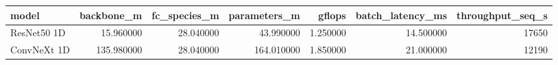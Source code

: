 \begin{tabular}{lrrrrrr}
\toprule
model & backbone_m & fc_species_m & parameters_m & gflops & batch_latency_ms & throughput_seq_s \\
\midrule
ResNet50 1D & 15.960000 & 28.040000 & 43.990000 & 1.250000 & 14.500000 & 17650 \\
ConvNeXt 1D & 135.980000 & 28.040000 & 164.010000 & 1.850000 & 21.000000 & 12190 \\
\bottomrule
\end{tabular}

